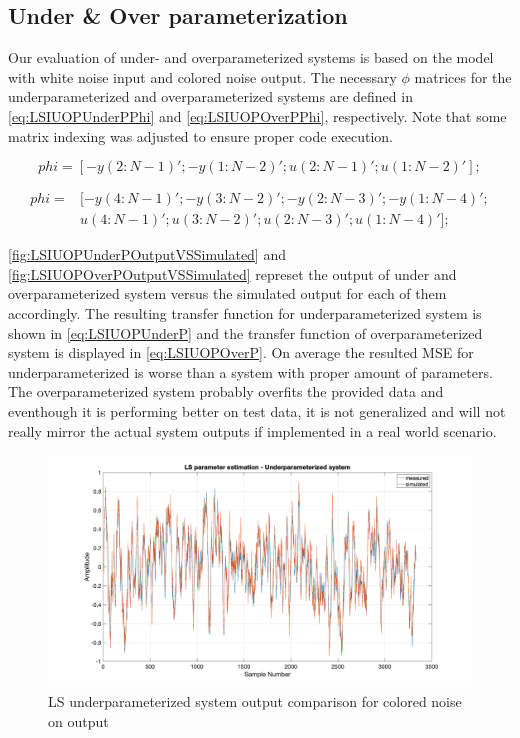\FloatBarrier
\subsection{Under \& Over parameterization}
Our evaluation of under- and overparameterized systems is based on the model with white noise input and colored noise output. The necessary $\phi$ matrices for the underparameterized and overparameterized systems are defined in \autoref{eq:LSIUOPUnderPPhi} and \autoref{eq:LSIUOPOverPPhi}, respectively. Note that some matrix indexing was adjusted to ensure proper code execution.

\begin{equation}
	phi = [-y(2:N-1)'; -y(1:N-2)'; u(2:N-1)'; u(1:N-2)'];
	\label{eq:LSIUOPUnderPPhi}
\end{equation}


\begin{equation}
	\begin{aligned}
	phi = &[-y(4:N-1)'; -y(3:N-2)'; -y(2:N-3)'; -y(1:N-4)';\\
	 &u(4:N-1)'; u(3:N-2)'; u(2:N-3)'; u(1:N-4)'];
	\end{aligned}
	\label{eq:LSIUOPOverPPhi}
\end{equation}


\autoref{fig:LSIUOPUnderPOutputVSSimulated} and \autoref{fig:LSIUOPOverPOutputVSSimulated} represet the output of under and overparameterized system versus the simulated output for each of them accordingly. The resulting transfer function for underparameterized system is shown in \autoref{eq:LSIUOPUnderP} and the transfer function of overparameterized system is displayed in \autoref{eq:LSIUOPOverP}. On average the resulted MSE for underparameterized is worse than a system with proper amount of parameters. The overparameterized system probably overfits the provided data and eventhough it is performing better on test data, it is not generalized and will not really mirror the actual system outputs if implemented in a real world scenario.

\begin{figure}
\centering
\includegraphics[totalheight=8cm]{images/LSIUOPUnderPOutputVSSimulated.png}
\caption{LS underparameterized system output comparison for colored noise on output}
\label{fig:LSIUOPUnderPOutputVSSimulated}
\end{figure}

